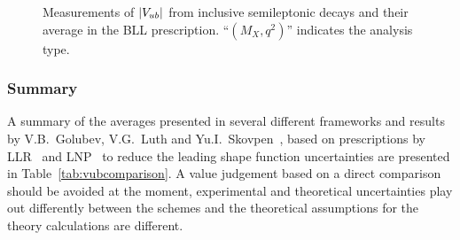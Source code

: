 \begin{figure}
\begin{center}
\end{center}
\caption{Measurements of $|V_{ub}|$ from inclusive semileptonic decays 
and their average in the BLL prescription.
``$(M_X, q^2)$'' indicates the analysis type.}
\label{fig:BLL}
\end{figure}


\subsubsection{Summary}
A summary of the averages presented in several different
frameworks and results by V.B.~Golubev, V.G.~Luth and Yu.I.~Skovpen~\cite{Golubev:2007cs},
based on prescriptions by LLR~\cite{Leibovich:1999xf} and LNP~\cite{Lange:2005qn} 
to reduce the leading shape function uncertainties are presented in 
Table~\ref{tab:vubcomparison}.
A value judgement based on a direct comparison should be
avoided at the moment, experimental and theoretical uncertainties play out
differently between the schemes and the theoretical assumptions for the
theory calculations are different.





